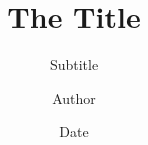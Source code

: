 \title[Footer Title]{The Title}
\subtitle[]{Subtitle}
\author{Author}
\date{Date}

\begin{frame}
    \titlepage
\end{frame}

%
